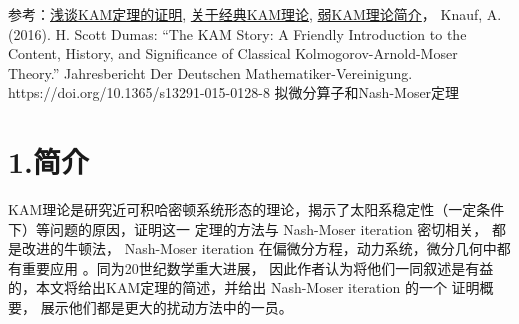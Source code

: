 \documentclass[12pt]{article}
\begin{document}
    参考：\href{https://zhuanlan.zhihu.com/p/53304713}{浅谈KAM定理的证明},
     \href{https://zhuanlan.zhihu.com/p/33763445}{关于经典KAM理论}, 
     \href{https://zhuanlan.zhihu.com/p/57840760}{弱KAM理论简介}，
     Knauf, A. (2016). H. Scott Dumas: “The KAM Story: A Friendly Introduction to the Content, History, and Significance of Classical Kolmogorov-Arnold-Moser Theory.” Jahresbericht Der Deutschen Mathematiker-Vereinigung. https://doi.org/10.1365/s13291-015-0128-8
     拟微分算子和Nash-Moser定理
     \section{1.简介}
     KAM理论是研究近可积哈密顿系统形态的理论，揭示了太阳系稳定性（一定条件下）等问题的原因，证明这一
     定理的方法与 Nash-Moser iteration 密切相关， 都是改进的牛顿法，
     Nash-Moser iteration 在偏微分方程，动力系统，微分几何中都有重要应用 。同为20世纪数学重大进展，
     因此作者认为将他们一同叙述是有益的，本文将给出KAM定理的简述，并给出 Nash-Moser iteration 的一个
     证明概要， 展示他们都是更大的扰动方法中的一员。
\end{document}

